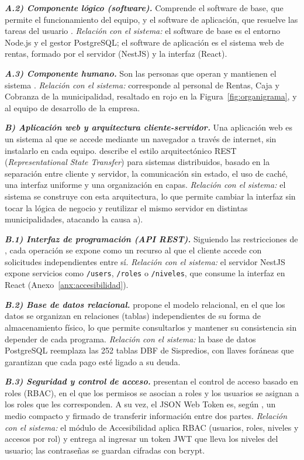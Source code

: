 \documentclass[12pt,a4paper]{report}
\begin{document}
\noindent\textbf{\textit{A.2) Componente lógico (software).}} Comprende el software de base, que permite el funcionamiento del equipo, y el software de aplicación, que resuelve las tareas del usuario \parencite{raya2014}. \textit{Relación con el sistema:} el software de base es el entorno Node.js y el gestor PostgreSQL; el software de aplicación es el sistema web de rentas, formado por el servidor (NestJS) y la interfaz (React).

\noindent\textbf{\textit{A.3) Componente humano.}} Son las personas que operan y mantienen el sistema \parencite{raya2014}. \textit{Relación con el sistema:} corresponde al personal de Rentas, Caja y Cobranza de la municipalidad, resaltado en rojo en la Figura~\ref{fig:organigrama}, y al equipo de desarrollo de la empresa.

\noindent\textbf{\textit{B) Aplicación web y arquitectura cliente-servidor.}} Una aplicación web es un sistema al que se accede mediante un navegador a través de internet, sin instalarlo en cada equipo. \textcite{fielding2000} describe el estilo arquitectónico REST (\textit{Representational State Transfer}) para sistemas distribuidos, basado en la separación entre cliente y servidor, la comunicación sin estado, el uso de caché, una interfaz uniforme y una organización en capas. \textit{Relación con el sistema:} el sistema se construye con esta arquitectura, lo que permite cambiar la interfaz sin tocar la lógica de negocio y reutilizar el mismo servidor en distintas municipalidades, atacando la causa a).

\noindent\textbf{\textit{B.1) Interfaz de programación (API REST).}} Siguiendo las restricciones de \textcite{fielding2000}, cada operación se expone como un recurso al que el cliente accede con solicitudes independientes entre sí. \textit{Relación con el sistema:} el servidor NestJS expone servicios como \texttt{/users}, \texttt{/roles} o \texttt{/niveles}, que consume la interfaz en React (Anexo~\ref{anx:accesibilidad}).

\noindent\textbf{\textit{B.2) Base de datos relacional.}} \textcite{codd1970} propone el modelo relacional, en el que los datos se organizan en relaciones (tablas) independientes de su forma de almacenamiento físico, lo que permite consultarlos y mantener su consistencia sin depender de cada programa. \textit{Relación con el sistema:} la base de datos PostgreSQL reemplaza las 252 tablas DBF de Sispredios, con llaves foráneas que garantizan que cada pago esté ligado a su deuda.

\noindent\textbf{\textit{B.3) Seguridad y control de acceso.}} \textcite{sandhu1996} presentan el control de acceso basado en roles (RBAC), en el que los permisos se asocian a roles y los usuarios se asignan a los roles que les corresponden. A su vez, el JSON Web Token es, según \textcite{rfc7519}, un medio compacto y firmado de transferir información entre dos partes. \textit{Relación con el sistema:} el módulo de Accesibilidad aplica RBAC (usuarios, roles, niveles y accesos por rol) y entrega al ingresar un token JWT que lleva los niveles del usuario; las contraseñas se guardan cifradas con bcrypt.
\end{document}

